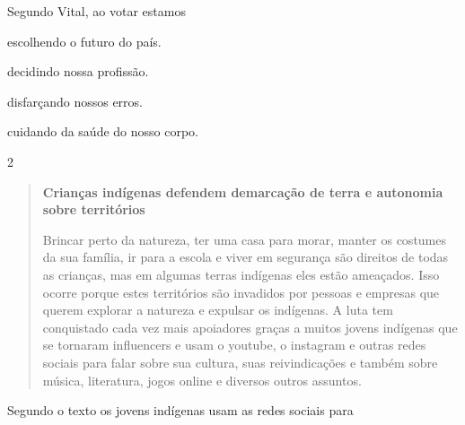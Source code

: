 Segundo Vital, ao votar estamos

\begin{escolha}
\item escolhendo o futuro do país.

\item decidindo nossa profissão.

\item disfarçando nossos erros.

\item cuidando da saúde do nosso corpo.
\end{escolha}


\num{2}

\begin{quote}
\textbf{Crianças indígenas defendem demarcação de terra e autonomia
sobre territórios}

Brincar perto da natureza, ter uma casa para morar, manter os costumes
da sua família, ir para a escola e viver em segurança são direitos de
todas as crianças, mas em algumas terras indígenas eles estão ameaçados.
Isso ocorre porque estes territórios são invadidos por pessoas e
empresas que querem explorar a natureza e expulsar os indígenas. A luta
tem conquistado cada vez mais apoiadores graças a muitos jovens
indígenas que se tornaram influencers e usam o youtube, o instagram e
outras redes sociais para falar sobre sua cultura, suas reivindicações e
também sobre música, literatura, jogos online e diversos outros
assuntos.

\end{quote}

Segundo o texto os jovens indígenas usam as redes sociais para

